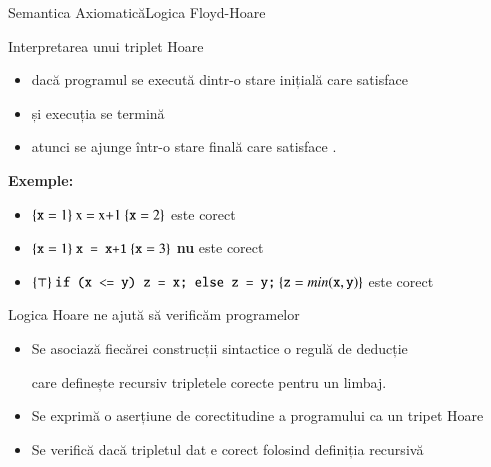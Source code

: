 \documentclass[xcolor=pdftex,romanian,colorlinks]{beamer}
\begin{document}
\begin{frame}{Semantica Axiomatică}{Logica Floyd-Hoare}
\begin{block}{Interpretarea unui triplet Hoare }
\begin{itemize}
\item dacă programul se execută dintr-o stare inițială care satisface 
\item și execuția se termină
\item atunci se ajunge într-o stare finală care satisface .
\end{itemize}
\end{block}

\pause  \vspace{.2cm}
\textbf{\color{True} Exemple:}
  \begin{itemize}
  \item $\{\texttt{x} = 1\}\ \mbox{\text{x = x+1}}\ \{\texttt{x} =2\}$ este corect
  \item $\{\texttt{x} = 1\}\ \mbox{\texttt{x = x+1}}\ \{\texttt{x} = 3\}$ {\bf nu} este corect
  \item $\{\top\}\ \mbox{\texttt{if (x <= y) z = x; else z = y;}}\ \{\texttt{z} = min(\mbox{\texttt{x}},\mbox{\texttt{y}})\}$ este corect
  \end{itemize}
\end{frame}

\begin{frame}
{Logica Hoare ne ajută să verificăm  programelor}

\begin{itemize}
  \item Se asociază fiecărei construcții sintactice o regulă de deducție

        care definește recursiv tripletele corecte pentru un limbaj.

  \vfill
  \item Se exprimă o aserțiune de corectitudine a programului ca un tripet Hoare

  \vfill
  \item Se verifică dacă tripletul dat e corect folosind definiția recursivă

\end{itemize}
\end{frame}
\end{document}
